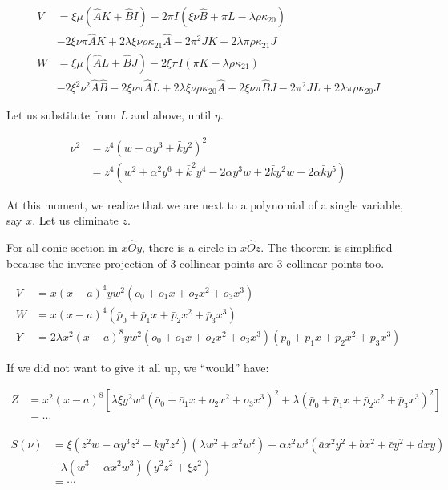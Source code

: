 \documentclass[12pt]{article}
\numberwithin{table}{section}
\begin{document}
\begin{align}
V &= \xi \mu(\hat AK  + \hat BI )-2\pi I(\xi \nu \hat B + \pi L - \lambda \rho \kappa_{20}) \nonumber\\
& -2\xi \nu \pi \hat A K +2 \lambda \xi \nu \rho \kappa_{21} \hat A -2  \pi^2 J K +2 \lambda \pi \rho \kappa_{21} J\\
W &= \xi \mu(\hat AL + \hat BJ) -2\xi \pi I(\pi K - \lambda \rho \kappa_{21})\nonumber\\
&-2\xi^2 \nu^2 \hat A \hat B -2 \xi \nu \pi \hat A L +2 \lambda \xi \nu \rho \kappa_{20} \hat A-2 \xi \nu \pi \hat B J -2 \pi^2 J L +2 \lambda \pi \rho \kappa_{20} J
\end{align}

Let us substitute from $L$ and above, until $\eta$.

\begin{align}
\nu^2 &= z^4 ( w - \alpha y^3 + \bar k y^2)^2\nonumber \\
&= z^4 (w^2 + \alpha^2 y^6 + \bar k^2 y^4 - 2  \alpha y^3 w + 2 \bar k y^2 w - 2 \alpha \bar k y^5)
\end{align}

At this moment, we realize that we are next to a polynomial of a single variable, say $x$. Let us eliminate $z$.

For all conic section in $x\hat O y$, there is a circle in $x\hat O z$. The theorem is simplified because the inverse projection of 3 collinear points are 3 collinear points too.

\begin{align}
V &= x(x-a)^4 yw^2(\bar o_0 + \bar o_1 x + o_2 x^2 + o_3 x^3) \\
W &= x(x-a)^4(\bar p_0 + \bar p_1 x + \bar p_2 x^2 + \bar p_3 x^3)\\
Y &= 2\lambda x^2(x-a)^8 yw^2(\bar o_0 + \bar o_1 x + o_2 x^2 + o_3 x^3)(\bar p_0 + \bar p_1 x + \bar p_2 x^2 + \bar p_3 x^3)
\end{align}

If we did not want to give it all up, we ``would'' have:

\begin{align}
Z &= x^2(x-a)^8 [\lambda\xi  y^2w^4(\bar o_0 + \bar o_1 x + o_2 x^2 + o_3 x^3)^2 + \lambda (\bar p_0 + \bar p_1 x + \bar p_2 x^2 + \bar p_3 x^3)^2] \nonumber\\
&= \cdots
\end{align}

\begin{align}
S(\nu)&=\xi (z^2 w - \alpha y^3 z^2 + \bar k y^2 z^2) (\lambda w^2 + x^2 w^2) + \alpha z^2w^3 (\bar a x^2 y^2 + \bar b x^2 + \bar c y^2 + \bar d xy) \nonumber\\
&- \lambda (w^3 - \alpha x^2 w^3) (y^2 z^2 + \xi z^2)\\
&= \cdots
\end{align}
\end{document}
